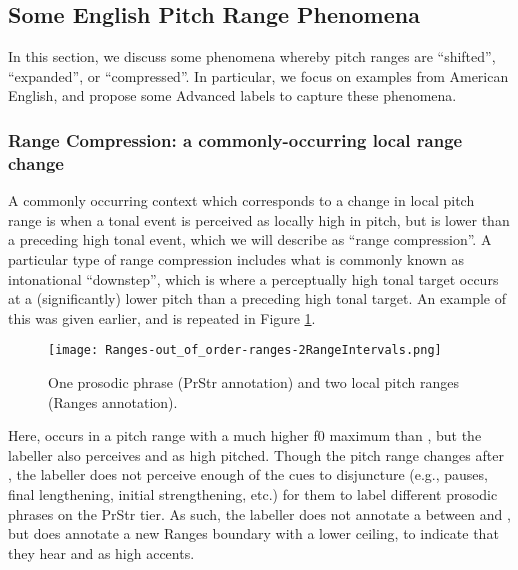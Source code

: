 
\subsection{Some English Pitch Range Phenomena}\label{sec:some-english-pitch-range-phenomena}

In this section, we discuss some phenomena whereby pitch ranges are “shifted”, “expanded”, or “compressed”. In particular, we focus on examples from American English, and propose some Advanced labels to capture these phenomena.

\subsubsection{Range Compression: a commonly-occurring local range change}\label{sec:range-compression-a-commonly-occurring-local-range-change}

A commonly occurring context which corresponds to a change in local pitch range is when a tonal event is perceived as locally high in pitch, but is lower than a preceding high tonal event, which we will describe as “range compression”. A particular type of range compression includes what is commonly known as intonational “downstep”, which is where a perceptually high tonal target occurs at a (significantly) lower pitch than a preceding high tonal target. An example of this was given earlier, and is repeated in Figure \ref{fig:out_of_order-ranges Ranges Adv}.

\begin{figure}[H]
\centering
%
\texttt{[image: Ranges-out\_of\_order-ranges-2RangeIntervals.png]}
%
\caption{One prosodic phrase (PrStr annotation) and two local pitch ranges (Ranges annotation).%
\label{fig:out_of_order-ranges Ranges Adv}%
}
\end{figure}

Here,  occurs in a pitch range with a much higher f0 maximum than , but the labeller also perceives  and  as high pitched. Though the pitch range changes after , the labeller does not perceive enough of the cues to disjuncture (e.g., pauses, final lengthening, initial strengthening, etc.) for them to label different prosodic phrases on the PrStr tier. As such, the labeller does not annotate a \textlabel{]} between  and , but does annotate a new Ranges boundary with a lower ceiling, to indicate that they hear  and  as high accents.

